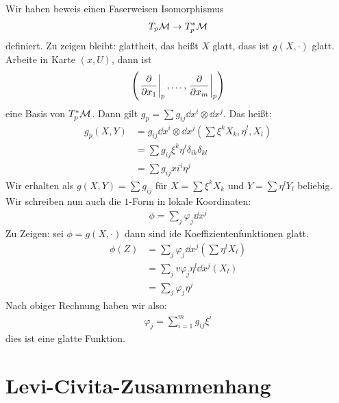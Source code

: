 \begin{bew}
Wir haben beweis einen Faserweisen Isomorphismus
\begin{align*}
T_p\mathcal{M} \to T^\ast_p \mathcal{M}
\end{align*}
definiert.
Zu zeigen bleibt:
glattheit, das heißt $X$ glatt, dass ist $g(X, \cdot)$ glatt.
Arbeite in Karte $(x, U)$, dann ist 
\begin{align*}
\left( \eval{\pdv{x_1}}_p, \dots,  \eval{\pdv{x_m}}_p \right)
\end{align*}
eine Basis von $T^\ast_p \mathcal{M}$.
Dann gilt $g_p = \sum g_{ij} \dd{x^i} \otimes \dd{x^j}$.
Das heißt:
\begin{align*}
g_p (X, Y) &= g_{ij} \dd{x^i} \otimes \dd{x^j} \left( \sum \xi^k X_k, \eta^l, X_l\right)\\
&= \sum g_{ij} \xi^k \eta^l \delta_{ik} \delta_{kl}\\
&= \sum g_{ij} xi^i \eta^j
\end{align*}
Wir erhalten als $g(X, Y) = \sum g_{ij}$ für $X= \sum \xi^k X_k$ und $Y= \sum \eta^l Y_l$ beliebig.
Wir schreiben nun auch die $1$-Form in lokale Koordinaten:
\begin{align}
\phi = \sum_j \varphi_j \dd{x^j}
\end{align}
Zu Zeigen: sei $\phi = g(X, \cdot)$ dann sind ide Koeffizientenfunktionen glatt.
\begin{align*}
\phi(Z) &= \sum_j \varphi_j \dd{x^j} \left( \sum \eta^l X_l \right)\\
&= \sum_{j} v\varphi_j \eta^l \dd{x^j} (X_l)\\
&= \sum_j \varphi_j \eta^j
\end{align*}
Nach obiger Rechnung haben wir also:
\begin{align}
\varphi_j = \sum^m_{i=1} g_{ij} \xi^i
\end{align}
dies ist eine glatte Funktion.
\end{bew}

\section{Levi-Civita-Zusammenhang}

